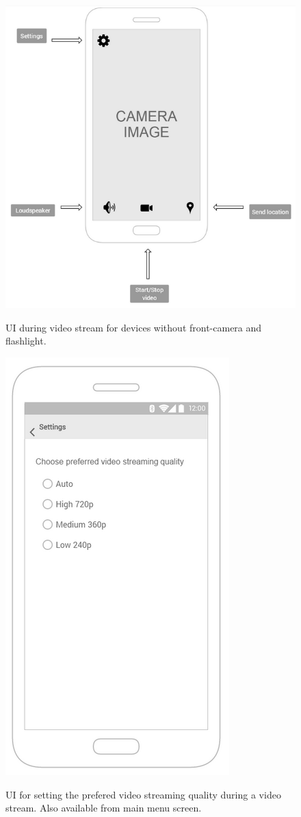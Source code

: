 \documentclass{article}
\begin{document}
    
	
	\begin{figure}[h]
		\centering
		\includegraphics[width=.9\textwidth]{"VideoStream/14"}

		UI during video stream for devices without front-camera and flashlight.
	\end{figure} \clearpage
    
    
	
	\begin{figure}[h]
		\centering
		\includegraphics[width=.6\textwidth]{"VideoStream/15"}

		UI for setting the prefered video streaming quality during a video stream. Also available from main menu screen.
	\end{figure} \clearpage
    
\end{document}
